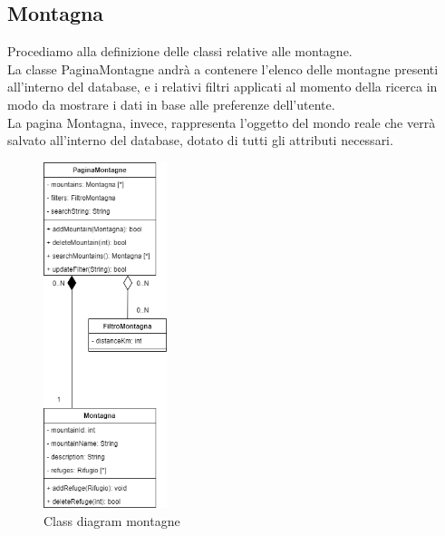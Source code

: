 \documentclass[a4paper,12pt]{article}
\begin{document}
\subsection{Montagna}
Procediamo alla definizione delle classi relative alle montagne. \\
La classe PaginaMontagne andrà a contenere l'elenco delle montagne presenti all'interno del database, e i relativi filtri applicati al momento della ricerca in modo da mostrare i dati in base alle preferenze dell'utente.\\
La pagina Montagna, invece, rappresenta l'oggetto del mondo reale che verrà salvato all'interno del database, dotato di tutti gli attributi necessari.
\begin{figure}[H]
   \centering
   \includegraphics[width=0.32\textwidth] {D3/img/class_diagram_mountains.png}
    \caption{Class diagram montagne}
\end{figure}
\newpage
\end{document}
